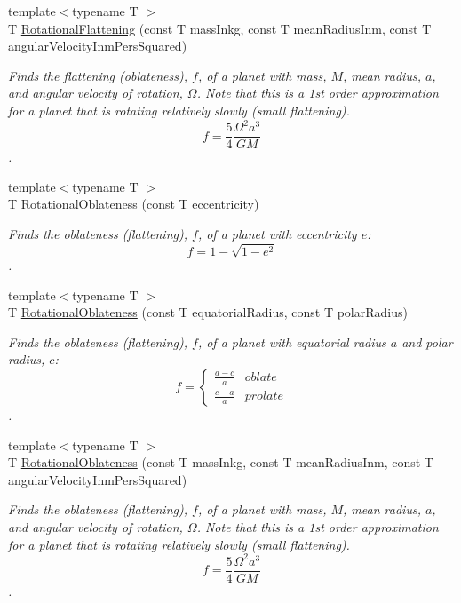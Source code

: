 \begin{DoxyCompactItemize}
{\footnotesize template$<$typename T $>$ }\\T \mbox{\hyperlink{group___e_g_x_phys-_astrophysics-_rotational_flattening_ga316b9afb6e1aa940fa96417c6f24ed4d}{Rotational\+Flattening}} (const T mass\+Inkg, const T mean\+Radius\+Inm, const T angular\+Velocity\+Inm\+Pers\+Squared)
\begin{DoxyCompactList}\small\item\em Finds the flattening (oblateness), $f$, of a planet with mass, $M$, mean radius, $a$, and angular velocity of rotation, $\Omega$. Note that this is a 1st order approximation for a planet that is rotating relatively slowly (small flattening). \[ f = \frac{5}{4} \frac{\Omega^2 a^3}{GM} \]. \end{DoxyCompactList}\item 
{\footnotesize template$<$typename T $>$ }\\T \mbox{\hyperlink{group___e_g_x_phys-_astrophysics-_rotational_flattening_ga494ad3b296185bf65ccf3e2ddebc189a}{Rotational\+Oblateness}} (const T eccentricity)
\begin{DoxyCompactList}\small\item\em Finds the oblateness (flattening), $f$, of a planet with eccentricity $e$\+: \[ f = 1 - \sqrt{1-e^2} \]. \end{DoxyCompactList}\item 
{\footnotesize template$<$typename T $>$ }\\T \mbox{\hyperlink{group___e_g_x_phys-_astrophysics-_rotational_flattening_ga0bbe606845430e58be5ed34541835f83}{Rotational\+Oblateness}} (const T equatorial\+Radius, const T polar\+Radius)
\begin{DoxyCompactList}\small\item\em Finds the oblateness (flattening), $f$, of a planet with equatorial radius $a$ and polar radius, $c$\+: \[ f =\begin{cases} \frac{a-c}{a}{} & oblate \\ \frac{c-a}{a} & prolate \end{cases} \]. \end{DoxyCompactList}\item 
{\footnotesize template$<$typename T $>$ }\\T \mbox{\hyperlink{group___e_g_x_phys-_astrophysics-_rotational_flattening_ga7d78d01c8b3e1a9b2e4f17cb67969a88}{Rotational\+Oblateness}} (const T mass\+Inkg, const T mean\+Radius\+Inm, const T angular\+Velocity\+Inm\+Pers\+Squared)
\begin{DoxyCompactList}\small\item\em Finds the oblateness (flattening), $f$, of a planet with mass, $M$, mean radius, $a$, and angular velocity of rotation, $\Omega$. Note that this is a 1st order approximation for a planet that is rotating relatively slowly (small flattening). \[ f = \frac{5}{4} \frac{\Omega^2 a^3}{GM} \]. \end{DoxyCompactList}\item 

\end{DoxyCompactItemize}
